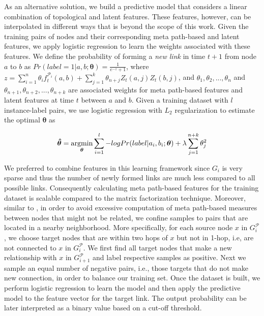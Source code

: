 As an alternative solution, we build a predictive model that considers a linear combination of topological and latent features. These features, however, can be interpolated in different ways that is beyond the scope of this work. Given the training pairs of nodes and their corresponding meta path-based and latent features, we apply logistic regression to learn the weights associated with these features. We define the probability of forming a \textit{new link} in time $t+1$ from node $a$ to $b$ as %
 $Pr(label=1|a, b; \boldsymbol{\theta}) = \frac{1}{e^{-z}+1}$, where $z=\sum\limits_{i=1}^{n}\theta_i f_t^{\mathcal{P}_i}(a,b) + \sum\limits_{j=1}^{k} \theta_{n+j}Z_t(a,j)Z_t(b,j)$, and $\theta_1,\theta_2,..., \theta_n$ and $\theta_{n+1},\theta_{n+2},..., \theta_{n+k}$ are associated weights for meta path-based features and latent features at time $t$ between $a$ and $b$. Given a training dataset with $l$ instance-label pairs, we use logistic regression with $L_2$ regularization to estimate the optimal $\boldsymbol{\theta}$ as%


\begin{equation}
\boldsymbol{\hat{\theta}} = 
\operatorname*{argmin}\limits_{\boldsymbol{\theta}}\sum_{i=1}^l -log Pr(label |a_i, b_i; \boldsymbol{\theta}) + \lambda \sum_{j=1}^{n+k} \theta_j^2
\end{equation}
 
We preferred to combine features in this learning framework since $G_i$ is very sparse and thus the number of newly formed links are much less compared to all possible links. Consequently calculating meta path-based features for the training dataset is scalable compared to the matrix factorization technique. Moreover, similar to \cite{sun2011ASONAM}, in order to avoid excessive computation of meta path-based measures between nodes that might not be related, we confine samples to pairs that are located in a nearby neighborhood. More specifically, for each source node $x$ in $G^\mathcal{P}_{i}$, we choose target nodes that are within two hops of $x$ but not in 1-hop, i.e, are not connected to $x$ in $G^\mathcal{P}_{i}$. We first find all target nodes that make a new relationship with $x$  in $G^\mathcal{P}_{i+1}$ and label respective samples as positive. Next we sample an equal number of negative pairs, i.e., those targets that do not make new connection, in order to balance our training set. Once the dataset is built, we perform logistic regression to learn the model and then apply the predictive model to the feature vector for the target link. The output probability can be later interpreted as a binary value based on a cut-off threshold.



